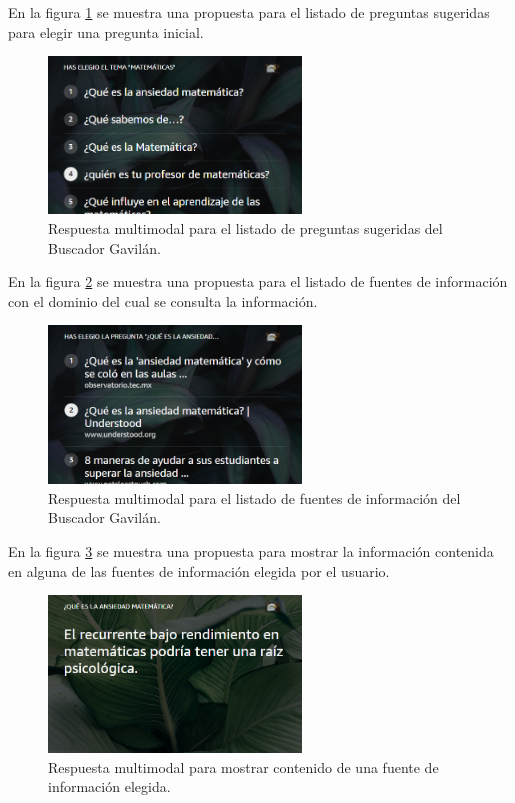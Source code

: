 En la figura \ref{fig:53} se muestra una propuesta para el listado de preguntas sugeridas para elegir una pregunta inicial.

\begin{figure}[H]
  \centering
  \includegraphics[width=0.60\textwidth]{Cap5/Figuras/Multimodal2.png}
  \caption{Respuesta multimodal para el listado de preguntas sugeridas del Buscador Gavilán.}
  \label{fig:53}
\end{figure}

En la figura \ref{fig:54} se muestra una propuesta para el listado de fuentes de información con el dominio del cual se consulta la información.

\begin{figure}[H]
  \centering
  \includegraphics[width=0.60\textwidth]{Cap5/Figuras/Multimodal3.png}
  \caption{Respuesta multimodal para el listado de fuentes de información del Buscador Gavilán.}
  \label{fig:54}
\end{figure}

En la figura \ref{fig:55} se muestra una propuesta para mostrar la información contenida en alguna de las fuentes de información elegida por el usuario.

\begin{figure}[H]
  \centering
  \includegraphics[width=0.60\textwidth]{Cap5/Figuras/Multimodal4.png}
  \caption{Respuesta multimodal para mostrar contenido de una fuente de información elegida.}
  \label{fig:55}
\end{figure}

